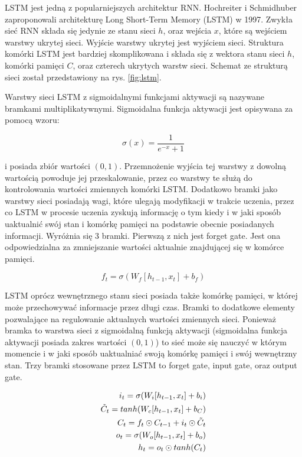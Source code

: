 \documentclass[oneside, mag]{mgr}
\begin{document}
LSTM jest jedną z popularniejszych architektur RNN. Hochreiter i Schmidhuber zaproponowali architekturę Long Short-Term Memory (LSTM) \cite{LSTM} w 1997. Zwykła sieć RNN składa się jedynie ze stanu sieci $h$, oraz wejścia $x$, które są wejściem warstwy ukrytej sieci. Wyjście warstwy ukrytej jest wyjściem sieci. Struktura komórki LSTM jest bardziej skomplikowana i składa się z wektora stanu sieci $h$, komórki pamięci $C$, oraz czterech ukrytych warstw sieci. Schemat ze strukturą sieci został przedstawiony na rys. \ref{fig:lstm}.

Warstwy sieci LSTM z sigmoidalnymi funkcjami aktywacji są nazywane bramkami multiplikatywnymi. Sigmoidalna funkcja aktywacji jest opisywana za pomocą wzoru:

\begin{equation}
	\sigma(x) = \frac{1}{e^{-x} + 1}
\end{equation}

i posiada zbiór wartości $(0, 1)$. Przemnożenie wyjścia tej warstwy z dowolną wartością powoduje jej przeskalowanie, przez co warstwy te służą do kontrolowania wartości zmiennych komórki LSTM. Dodatkowo bramki jako warstwy sieci posiadają wagi, które ulegają modyfikacji w trakcie uczenia, przez co LSTM w procesie uczenia zyskują informację o tym kiedy i w jaki sposób uaktualnić swój stan i komórkę pamięci na podstawie obecnie posiadanych informacji. Wyróżnia się 3 bramki. Pierwszą z nich jest forget gate. Jest ona odpowiedzialna za zmniejszanie wartości aktualnie znajdującej się w komórce pamięci.  

\begin{equation}
	f_t = \sigma( W_f [ h_{t-1}, x_t ] + b_f )
\end{equation}



LSTM oprócz wewnętrznego stanu sieci posiada także komórkę pamięci, w której może przechowywać informacje przez długi czas. Bramki to dodatkowe elementy pozwalające na regulowanie aktualnych wartości zmiennych sieci. Ponieważ bramka to warstwa sieci z sigmoidalną funkcją aktywacji (sigmoidalna funkcja aktywacji posiada zakres wartości $(0,1)$) to sieć może się nauczyć w którym momencie i w jaki sposób uaktualniać swoją komórkę pamięci i swój wewnętrzny stan. Trzy bramki stosowane przez LSTM to forget gate, input gate, oraz output gate.

\begin{equation}
\centering
\begin{split}
	i_t = \sigma( W_i [ h_{t-1}, x_t ] + b_i ) \\
	\tilde{C}_t = tanh( W_c [ h_{t-1}, x_t ] + b_C ) \\
	C_t = f_t \odot C_{t-1} + i_t \odot \tilde{C}_t \\
	o_t = \sigma( W_o [ h_{t-1}, x_t ] + b_o ) \\
	h_t = o_t \odot tanh( C_t )
\end{split}
\end{equation}
\end{document}
